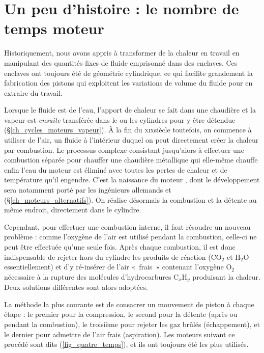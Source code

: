 \atstartofhistorysection
\section[Un peu d’histoire : le nombre de temps moteur]{Un peu d’histoire :\onlyamphibook{\\} le nombre de temps moteur}
\label{ch_deux_temps}

	Historiquement, nous avons appris à transformer de la chaleur en travail en manipulant des quantités fixes de fluide emprisonné dans des enclaves. Ces enclaves ont toujours été de géométrie cylindrique, ce qui facilite grandement la fabrication des pistons qui exploitent les variations de volume du fluide pour en extraire du travail.
	
	Lorsque le fluide est de l’eau, l’apport de chaleur se fait dans une chaudière et la vapeur est \emph{ensuite} transférée dans le ou les cylindres pour y être détendue (\S\ref{ch_cycles_moteurs_vapeur}). À la fin du \textsc{xix}\ieme siècle toutefois, on commence à utiliser de l’air, un fluide à l’intérieur duquel on peut directement créer la chaleur par combustion. Le processus complexe consistant jusqu’alors à effectuer une combustion séparée pour chauffer une chaudière métallique qui elle-même chauffe enfin l’eau du moteur est éliminé avec toutes les pertes de chaleur et de température qu’il engendre. C’est la naissance du moteur , dont le développement sera notamment porté par les ingénieurs allemands  et  (\S\ref{ch_moteurs_alternatifs}). On réalise désormais la combustion et la détente au même endroit, directement dans le cylindre.
	
	Cependant, pour effectuer une combustion interne, il faut résoudre un nouveau problème : comme l’oxygène de l’air est utilisé pendant la combustion, celle-ci ne peut être effectuée qu’une seule fois. Après chaque combustion, il est donc indispensable de rejeter hors du cylindre les produits de réaction ($\text{CO}_2$ et $\text{H}_2\text{O}$ essentiellement) et d’y ré-insérer de l’air «~frais~» contenant l’oxygène $\text{O}_2$ nécessaire à la rupture des molécules d’hydrocarbures $\text{C}_x\text{H}_y$ produisant la chaleur. Deux solutions différentes sont alors adoptées.
	
	La méthode la plus courante est de consacrer un mouvement de piston à chaque étape : le premier pour la compression, le second pour la détente (après ou pendant la combustion), le troisième pour rejeter les gaz brûlés (échappement), et le dernier pour admettre de l’air frais (aspiration). Les moteurs suivant ce procédé sont dits  (\cref{fig_quatre_temps}), et ils ont toujours été les plus utilisés.
	
